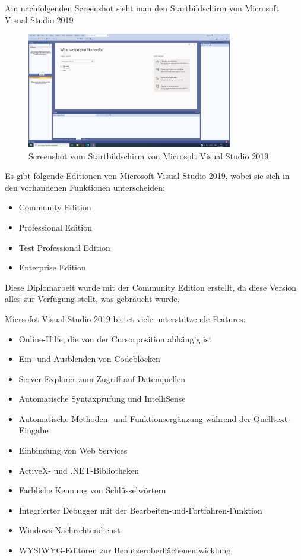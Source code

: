 Am nachfolgenden Screenshot sieht man den Startbildschirm von Microsoft Visual Studio 2019
\begin{figure}[h]
	\centerline{
	\includegraphics[width=0.8\textwidth]{./grafiken/visual_studio_startview.png}
	}
	\vskip0pt
	\caption{Screenshot vom Startbildschirm von Microsoft Visual Studio 2019} \label{fig:visualStudioStartview}
\end{figure}

Es gibt folgende Editionen von Microsoft Visual Studio 2019, wobei sie sich in den vorhandenen Funktionen unterscheiden:
\begin{itemize}
	\item Community Edition
	\item Professional Edition
	\item Test Professional Edition
	\item Enterprise Edition
\end{itemize}

Diese Diplomarbeit wurde mit der Community Edition erstellt, da diese Version alles zur Verfügung stellt, was gebraucht wurde. \autocite{wikiVisualStudio}

Micrsofot Visual Studio 2019 bietet viele unterstützende Features:
\begin{itemize}
	\item Online-Hilfe, die von der Cursorposition abhängig ist
	\item Ein- und Ausblenden von Codeblöcken
	\item Server-Explorer zum Zugriff auf Datenquellen
	\item Automatische Syntaxprüfung und IntelliSense
	\item Automatische Methoden- und Funktionsergänzung während der Quelltext-Eingabe
	\item Einbindung von Web Services
	\item ActiveX- und .NET-Bibliotheken
    \item Farbliche Kennung von Schlüsselwörtern
    \item Integrierter Debugger mit der Bearbeiten-und-Fortfahren-Funktion
	\item Windows-Nachrichtendienst
	\item WYSIWYG-Editoren zur Benutzeroberflächenentwicklung
\end{itemize}

